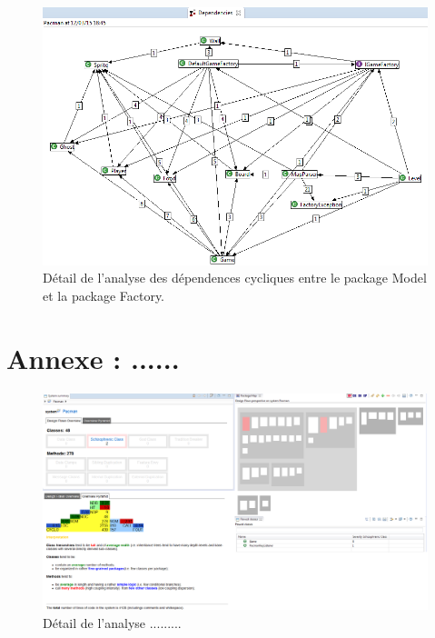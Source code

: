 \documentclass[12pt,a4paper,final]{article}
\begin{document}
\begin{figure}
	\centering
	\includegraphics[width=\textwidth]{images/DependenciesModel_Factory.png} %
	\caption{\label{deadcode}Détail de l'analyse des dépendences cycliques entre le package Model et la package Factory.} %
\end{figure}



\newpage
\section{Annexe : ......}\label{InCode}

\begin{figure}
	\centering
	\includegraphics[width=\textwidth]{images/InCodeDesignFlaws.png}
	\caption{\label{incodeDF}Détail de l'analyse .........}
\end{figure}
\end{document}
